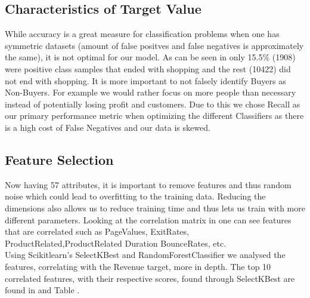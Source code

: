 \subsection{Characteristics of Target Value}
While accuracy is a great measure for classification problems when one has symmetric datasets (amount of false positves and false negatives is approximately the same), it is not optimal for our model.
As can be seen in  only 15.5\% (1908) were positive class samples that ended with shopping and the rest (10422) did not end with shopping. It is more important to not falsely identify Buyers as Non-Buyers. For example we would rather focus on more people than necessary instead of potentially losing profit and customers. Due to this we chose Recall as our primary performance metric when optimizing the different Classifiers as there is a high cost of False Negatives and our data is skewed.

\subsection{Feature Selection}
Now having 57 attributes, it is important to remove features and thus random noise which could lead to overfitting to the training data. Reducing the dimensions also allows us to reduce training time and thus lets us train with more different parameters. Looking at the correlation matrix in  one can see features that are correlated such as PageValues, ExitRates, ProductRelated,ProductRelated Duration BounceRates, etc.  
 \\
\newline
Using Scikitlearn's SelectKBest and RandomForestClassifier we analysed the features, correlating with the Revenue target, more in depth. The top 10 correlated features, with their respective scores, found through SelectKBest are found in  and Table . \\

